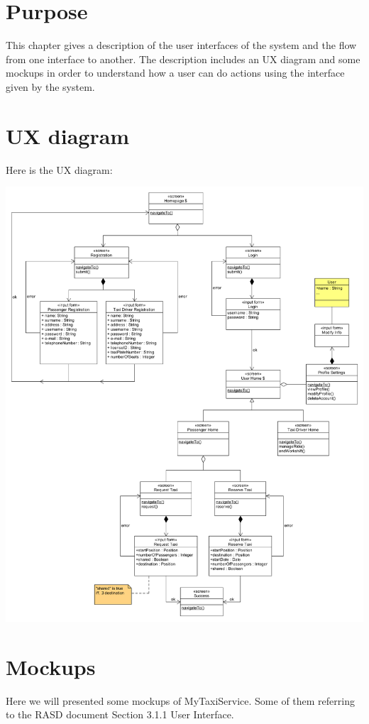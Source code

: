 \section{Purpose}

This chapter gives a description of the user interfaces of the system and the flow from one interface to another. The description includes an UX diagram and some mockups in order to understand how a user can do actions using the interface given by the system.

\section{UX diagram}
Here is the UX diagram:
	\begin{center}
		\includegraphics[height=\textheight]{diagrams/UX.jpg}
	\end{center}

\section{Mockups}
Here we will presented some mockups of MyTaxiService. Some of them referring to the RASD document Section 3.1.1 User Interface.

